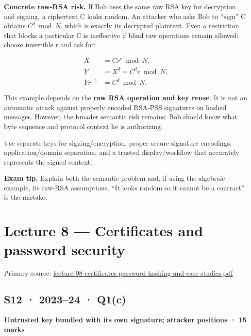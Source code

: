 \documentclass[11pt,a4paper]{article}
\begin{document}
\textbf{Concrete raw-RSA risk.} If Bob uses the same raw RSA key for decryption and signing,\allowbreak{} a ciphertext C looks random. An attacker who asks Bob to “sign” C obtains \(C^d\bmod N\),\allowbreak{} which is exactly its decrypted plaintext. Even a restriction that blocks a particular C is ineffective if blind raw operations remain allowed: choose invertible r and ask for:



\[
\begin{aligned}X&=Cr^e\bmod N,\\Y&=X^d=C^dr\bmod N,\\Yr^{-1}&=C^d\bmod N.\end{aligned}
\]

This example depends on the \textbf{raw RSA operation and key reuse}. It is not an automatic attack against properly encoded RSA-PSS signatures on hashed messages. However,\allowbreak{} the broader semantic risk remains: Bob should know what byte sequence and protocol context he is authorizing.


Use separate keys for signing/\allowbreak{}encryption,\allowbreak{} proper secure signature encodings,\allowbreak{} application/\allowbreak{}domain separation,\allowbreak{} and a trusted display/\allowbreak{}workflow that accurately represents the signed content.



{\color{ForestGreen}\textbf{Exam tip.} Explain both the semantic problem and,\allowbreak{} if using the algebraic example,\allowbreak{} its raw-RSA assumptions. “It looks random so it cannot be a contract” is the mistake.}



\clearpage
\section{Lecture 8 — Certificates and password security}

Primary source: \href{../slides/lecture-08-certificates-password-hashing-and-case-studies.pdf}{lecture-08-certificates-password-hashing-and-case-studies.\allowbreak{}pdf}




\subsection{S12 · 2023–24 · Q1(c)}\label{s12}

\textbf{Untrusted key bundled with its own signature; attacker positions · 15 marks}
\end{document}
